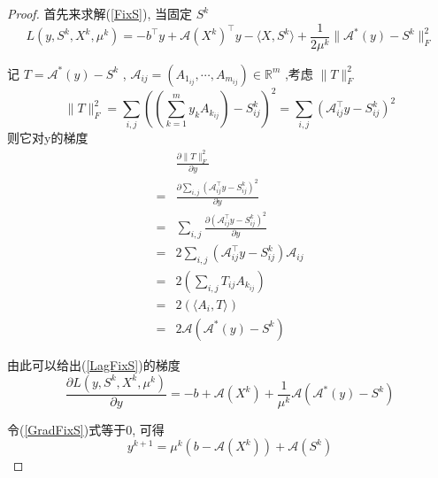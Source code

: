 \documentclass[a4paper, UTF8]{ctexart}
\numberwithin{equation}{section}  %
\begin{document}
			\begin{proof}
				首先来求解(\ref{FixS}), 当固定 $S^k$
				\begin{equation}\label{LagFixS}
						L(y, S^k, X^k, \mu^k)
					=	-b^\top y + \mathcal{A}(X^k)^\top y - \langle{X, S^k}\rangle+ \frac{1}{2\mu^k} \lVert{\mathcal{A}^*(y) - S^k}\rVert^2_F
				\end{equation}

				记 $T = \mathcal{A}^*(y) - S^k$ , $\mathcal{A}_{ij} = (A_{1_{ij}}, \cdots, A_{m_{ij}}) \in \mathbb{R}^{m}$ ,考虑 $\lVert{T}\rVert^2_F$
				\[
						\lVert{T}\rVert^2_F
					=	\sum_{i, j}((\sum^m_{k = 1} y_k A_{k_{ij}}) - S^k_{ij})^2
					=	\sum_{i, j}(\mathcal{A}_{ij}^\top y - S^k_{ij})^2
				\]
				则它对y的梯度
				\begin{equation}
					\begin{aligned}
							& \frac{\partial \lVert{T}\rVert^2_F}{\partial y}\\
						=	& \frac{\partial \sum_{i, j}(\mathcal{A}_{ij}^\top y - S^k_{ij})^2}{\partial y}\\
						=	& \sum_{i, j}\frac{\partial (\mathcal{A}_{ij}^\top y - S^k_{ij})^2}{\partial y} \\
						=	& 2\sum_{i, j}(\mathcal{A}_{ij}^\top y - S^k_{ij}) \mathcal{A}_{ij}\\
						=	& 2(\sum_{i, j}T_{ij} A_{k_{ij}})\\
						=	& 2(\langle{A_i, T}\rangle)\\
						=	& 2\mathcal{A}(\mathcal{A}^*(y) - S^k)
					\end{aligned}
				\end{equation}

				\quad 由此可以给出(\ref{LagFixS})的梯度
				\begin{equation}\label{GradFixS}
						\frac{\partial L(y, S^k, X^k, \mu^k)}{\partial y}
					=	-b + \mathcal{A}(X^k) + \frac{1}{\mu^k} \mathcal{A}(\mathcal{A}^*(y) - S^k)
				\end{equation}

				\quad 令(\ref{GradFixS})式等于0, 可得
				\begin{equation}
					y^{k + 1} = \mu^k(b - \mathcal{A}(X^k)) + \mathcal{A}(S^k)
				\end{equation}


\end{proof}
\end{document}

